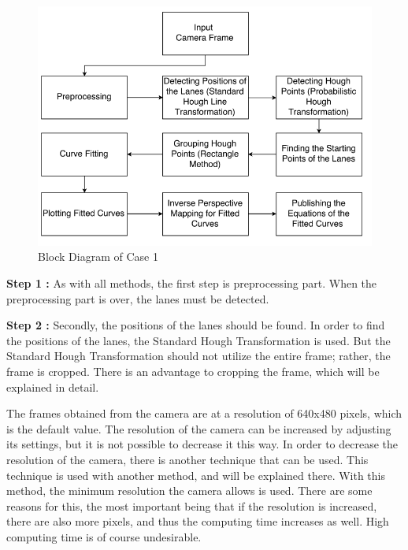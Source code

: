 \begin{figure}[H]
 \centering
  \includegraphics[width=1\textwidth]{./Bilder/Case1_BlockDiagram.png}		 \caption{Block Diagram of Case 1}
  \label{fig:Case1_BlockDiagram}
\end{figure}



\textbf{Step 1 : }As with all methods, the first step is preprocessing part. When the preprocessing part is over, the lanes must be detected. 

\textbf{Step 2 : }Secondly, the positions of the lanes should be found. In order to find the positions of the lanes, the Standard Hough Transformation is used. But the Standard Hough Transformation should not utilize the entire frame; rather, the frame is cropped. There is an advantage to cropping the frame, which will be explained in detail.


The frames obtained from the camera are at a resolution of 640x480 pixels, which is the default value. The resolution of the camera can be increased by adjusting its settings, but it is not possible to decrease it this way. In order to decrease the resolution of the camera, there is another technique that can be used. This technique is used with another method, and will be explained there. With this method, the minimum resolution the camera allows is used. There are some reasons for this, the most important being that if the resolution is increased, there are also more pixels, and thus the computing time increases as well. High computing time is of course undesirable.
 
